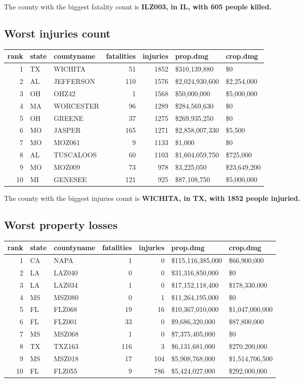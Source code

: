 \documentclass[]{article}
\begin{document}
The county with the biggest fatality count is \textbf{ILZ003, in IL,
with 605 people killed.}

\subsection{Worst injuries count}\label{worst-injuries-count}

\begin{longtable}[]{@{}rllrrll@{}}
\toprule
rank & state & countyname & fatalities & injuries & prop.dmg &
crop.dmg\tabularnewline
\midrule
\endhead
1 & TX & WICHITA & 51 & 1852 & \$310,139,880 & \$0\tabularnewline
2 & AL & JEFFERSON & 110 & 1576 & \$2,024,930,600 &
\$2,254,000\tabularnewline
3 & OH & OHZ42 & 1 & 1568 & \$50,000,000 & \$5,000,000\tabularnewline
4 & MA & WORCESTER & 96 & 1289 & \$284,569,630 & \$0\tabularnewline
5 & OH & GREENE & 37 & 1275 & \$269,935,250 & \$0\tabularnewline
6 & MO & JASPER & 165 & 1271 & \$2,858,007,330 & \$5,500\tabularnewline
7 & MO & MOZ061 & 9 & 1133 & \$1,000 & \$0\tabularnewline
8 & AL & TUSCALOOS & 60 & 1103 & \$1,604,059,750 &
\$725,000\tabularnewline
9 & MO & MOZ009 & 73 & 978 & \$3,225,050 & \$23,649,200\tabularnewline
10 & MI & GENESEE & 121 & 925 & \$87,108,750 &
\$5,000,000\tabularnewline
\bottomrule
\end{longtable}

The county with the biggest injuries count is \textbf{WICHITA, in TX,
with 1852 people injuried.}

\subsection{Worst property losses}\label{worst-property-losses}

\begin{longtable}[]{@{}rllrrll@{}}
\toprule
rank & state & countyname & fatalities & injuries & prop.dmg &
crop.dmg\tabularnewline
\midrule
\endhead
1 & CA & NAPA & 1 & 0 & \$115,116,385,000 & \$66,900,000\tabularnewline
2 & LA & LAZ040 & 0 & 0 & \$31,316,850,000 & \$0\tabularnewline
3 & LA & LAZ034 & 1 & 0 & \$17,152,118,400 &
\$178,330,000\tabularnewline
4 & MS & MSZ080 & 0 & 1 & \$11,264,195,000 & \$0\tabularnewline
5 & FL & FLZ068 & 19 & 16 & \$10,367,010,000 &
\$1,047,000,000\tabularnewline
6 & FL & FLZ001 & 33 & 0 & \$9,686,320,000 & \$87,800,000\tabularnewline
7 & MS & MSZ068 & 1 & 0 & \$7,375,405,000 & \$0\tabularnewline
8 & TX & TXZ163 & 116 & 3 & \$6,131,681,000 &
\$270,200,000\tabularnewline
9 & MS & MSZ018 & 17 & 104 & \$5,908,768,000 &
\$1,514,706,500\tabularnewline
10 & FL & FLZ055 & 9 & 786 & \$5,424,027,000 &
\$292,000,000\tabularnewline
\bottomrule
\end{longtable}
\end{document}
